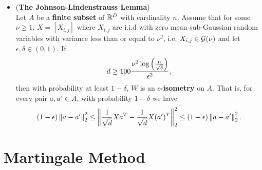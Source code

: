 \documentclass[11pt]{article}
\begin{document}
\begin{itemize}
\item \begin{theorem} (\textbf{The Johnson-Lindenstrauss Lemma}) \citep{boucheron2013concentration} \\
Let $A$ be a \textbf{finite subset} of ${\mathbb R}^D$ with cardinality $n$. Assume that for some $\nu \ge 1$, $X = [X_{i,j}]$  where $X_{i,j}$ are i.i.d with zero mean sub-Gaussian random variables with variance less than or equal to $\nu^2$, i.e. $X_{i,j} \in {\mathcal G}(\nu)$ and let $\epsilon, \delta \in (0, 1)$. If
\begin{align*}
d \ge 100 \frac{\nu^2  \log \left(\frac{n}{\sqrt{\delta}}\right)}{\epsilon^2},
\end{align*} then with probability at least $1 - \delta$,  $W$ is an \textbf{$\epsilon$-isometry} on $A$. That is, for every pair $a, a' \in A$, with probability $1- \delta$ we have 
\begin{align*}
(1 - \epsilon)\left\|a - a'\right\|_{2}^2 \le \left\|\frac{1}{\sqrt{d}} Xa^{T} - \frac{1}{\sqrt{d}} X(a')^{T}\right\|_{2}^2 \le (1 + \epsilon)\left\|a - a'\right\|_{2}^2.
\end{align*}
\end{theorem}
\end{itemize}

\section{Martingale Method}
\end{document}
